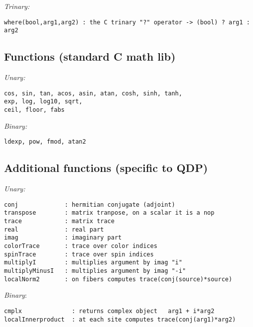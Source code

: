 \documentclass[12pt,letterpaper]{article}
\begin{document}
\noindent
{\em Trinary:}

\begin{verbatim}
where(bool,arg1,arg2) : the C trinary "?" operator -> (bool) ? arg1 : arg2
\end{verbatim}

\medskip


\subsection{Functions (standard C math lib)}
\label{sec:cfuncs}

\noindent
{\em Unary:}

\begin{verbatim}
cos, sin, tan, acos, asin, atan, cosh, sinh, tanh,
exp, log, log10, sqrt,
ceil, floor, fabs
\end{verbatim}

\noindent
{\em Binary:}

\begin{verbatim}
ldexp, pow, fmod, atan2
\end{verbatim}

\medskip


\subsection{Additional functions (specific to QDP)}
\label{sec:funcs}

\noindent
{\em Unary:}

\begin{verbatim}
conj             : hermitian conjugate (adjoint)
transpose        : matrix tranpose, on a scalar it is a nop
trace            : matrix trace
real             : real part
imag             : imaginary part
colorTrace       : trace over color indices
spinTrace        : trace over spin indices
multiplyI        : multiplies argument by imag "i"
multiplyMinusI   : multiplies argument by imag "-i"
localNorm2       : on fibers computes trace(conj(source)*source)
\end{verbatim}


\noindent
{\em Binary}:

\begin{verbatim}
cmplx              : returns complex object   arg1 + i*arg2
localInnerproduct  : at each site computes trace(conj(arg1)*arg2)
\end{verbatim}
\end{document}
